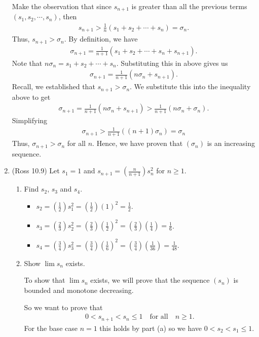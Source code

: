 \documentclass [10pt]{article}
\newcommand{\jg}[1]{{\color{blue} #1}}
\begin{document}
\begin{enumerate}
{Make the observation that since $s_{n+1}$ is greater than all the previous terms $(s_1, s_2, \cdots, s_n)$, then 
\begin{align*}
    s_{n+1} > \frac{1}{n} (s_1 + s_2 + \cdots + s_n) = \sigma_n.
\end{align*}
Thus, $s_{n+1} > \sigma_n$. By definition, we have 
\begin{align*}
    \sigma_{n+1} = \frac{1}{n+1} (s_1 + s_2 + \cdots + s_n + s_{n+1}). 
\end{align*}
Note that $n \sigma_n = s_1 + s_2 + \cdots + s_n$. Substituting this in above gives us 
\begin{align*}
    \sigma_{n+1} = \frac{1}{n+1} (n \sigma_n + s_{n+1}). 
\end{align*}
Recall, we established that $s_{n+1} > \sigma_n$. We substitute this into the inequality above to get 
\begin{align*}
    \sigma_{n+1} = \frac{1}{n+1} (n \sigma_n + s_{n+1}) > \frac{1}{n+1} (n \sigma_n + \sigma_n). 
\end{align*}
Simplifying 
\begin{align*}
    \sigma_{n+1} > \frac{1}{n+1} ((n+1) \sigma_n) = \sigma_n 
\end{align*}
Thus, $\sigma_{n+1} > \sigma_n$ for all $n$. Hence, we have proven that $(\sigma_n)$ is an increasing sequence. 
}
\clearpage

\item (Ross 10.9) Let $s_1 = 1$ and $s_{n+1} = ( \frac{n}{n+1})s^2_n$ for $n\geq
1$.
\begin{enumerate}
\item Find $s_2$, $s_3$ and $s_4$.

\jg{
\begin{itemize}
    \item $s_2 = (\frac{1}{2}) s_1^2 = (\frac{1}{2}) (1)^2 = \frac{1}{2}$. 
    \item $s_3 = (\frac{2}{3}) s_2^2 = (\frac{2}{3}) (\frac{1}{2})^2 = (\frac{2}{3})(\frac{1}{4}) = \frac{1}{6}$. 
    \item $s_4 = (\frac{3}{4}) s_3^2 = (\frac{3}{4}) (\frac{1}{6})^2 = (\frac{3}{4}) (\frac{1}{36}) = \frac{1}{48}$. 
\end{itemize}
}

\item Show $\lim s_n$ exists.

\jg{ 
To show that $\lim s_n$ exists, we will prove that the sequence $(s_n)$ is bounded and monotone decreasing. 

So we want to prove that 
\begin{align*}
    0 < s_{n+1} < s_n \leq 1 \quad \text{for all} \quad  n \geq 1. 
\end{align*}
For the base case $n=1$ this holds by part (a) so we have $0 < s_2 < s_1 \leq 1$. 

}
\end{enumerate}
\end{enumerate}
\end{document}
